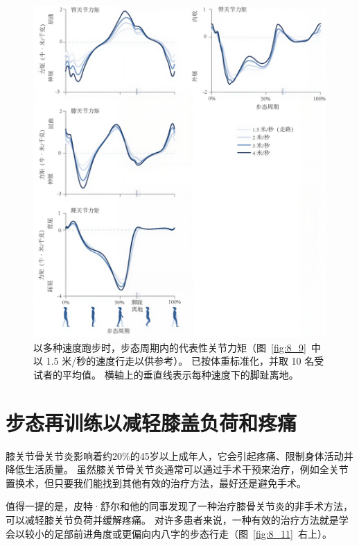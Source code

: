 \begin{figure}[!htb]
	\centering
	\includegraphics[width=1.0\linewidth]{chap8/8_10}
	\caption{以多种速度跑步时，步态周期内的代表性关节力矩（图~\ref{fig:8_9}~中以 1.5 米/秒的速度行走以供参考）。
		已按体重标准化，并取 10 名受试者的平均值。
		横轴上的垂直线表示每种速度下的脚趾离地\cite{hamner2013muscle}。 \label{fig:8_10}}
\end{figure}


\section{步态再训练以减轻膝盖负荷和疼痛}

膝关节骨关节炎影响着约20\%的45岁以上成年人，它会引起疼痛、限制身体活动并降低生活质量。
虽然膝关节骨关节炎通常可以通过手术干预来治疗，例如全关节置换术，但只要我们能找到其他有效的治疗方法，最好还是避免手术。


值得一提的是，皮特·舒尔和他的同事发现了一种治疗膝骨关节炎的非手术方法，可以减轻膝关节负荷并缓解疼痛。
对许多患者来说，一种有效的治疗方法就是学会以较小的足部前进角度或更偏向内八字的步态行走（图~\ref{fig:8_11}~右上）。


